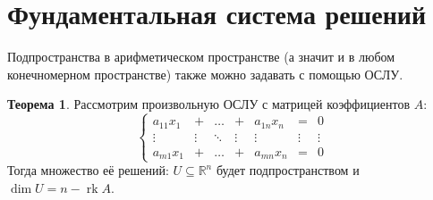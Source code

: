 \documentclass[12pt]{article}
\newcommand{\MR}{\mathbb{R}}
\theoremstyle{definition}
\newtheorem{theorem}{Теорема}
\DeclareMathOperator{\rk}{\text{rk}}
\begin{document}
\section*{Фундаментальная система решений}
Подпространства в арифметическом пространстве (а значит и в любом конечномерном пространстве) также можно задавать с помощью ОСЛУ.
\begin{theorem}
	Рассмотрим произвольную ОСЛУ с матрицей коэффициентов $A$:
	$$
		\left\{
		\begin{array}{ccccccc}
			a_{11}x_1 & + & \dotsc & + & a_{1n}x_n & = &  0\\
			\vdots  & \vdots & \ddots & \vdots & \vdots & \vdots & \vdots \\ 
			a_{m1}x_1 &  + & \dotsc & + & a_{mn}x_n & = & 0 
		\end{array}
		\right.
	$$
	Тогда множество её решений: $U \subseteq \MR^n$ будет подпространством и $\dim{U} = n - \rk{A}$. 
\end{theorem}
\end{document}

